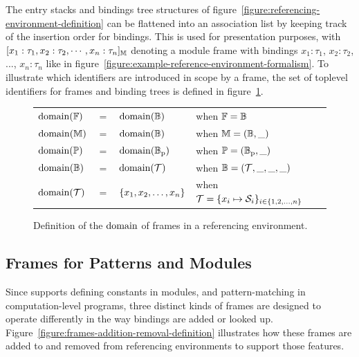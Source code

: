 The entry stacks and bindings tree structures of figure~\ref{figure:referencing-environment-definition} can be flattened into an association list by keeping track of the insertion order for bindings.
This is used for presentation purposes, with $[x_1 : \tau_1, x_2 : \tau_2, \cdots, x_n : \tau_n]_{\mathbb{M}}$ denoting a module frame with bindings $x_1 : \tau_1$, $x_2 : \tau_2$, ..., $x_n : \tau_n$ like in figure~\ref{figure:example-reference-environment-formalism}.
To illustrate which identifiers are introduced in scope by a frame, the set of toplevel identifiers for frames and binding trees is defined in figure~\ref{figure:definition-domain-frames}.

\begin{figure}[H]
\centering
{\footnotesize
\begin{tabular}{lcll}
$\operatorname{domain}(\mathbb{F})$ & $=$ & $\operatorname{domain}(\mathbb{B})$ & when $\mathbb{F} = \mathbb{B}$\\
$\operatorname{domain}(\mathbb{M})$ & $=$ & $\operatorname{domain}(\mathbb{B})$ & when $\mathbb{M} = (\mathbb{B}, \_)$\\
$\operatorname{domain}(\mathbb{P})$ & $=$ & $\operatorname{domain}(\mathbb{B}_{\text{p}})$ & when $\mathbb{P} = (\mathbb{B}_{\text{p}}, \_)$\\
$\operatorname{domain}(\mathbb{B})$ & $=$ & $\operatorname{domain}(\mathcal{T})$ & when $\mathbb{B}=(\mathcal{T}, \_, \_, \_)$\\
$\operatorname{domain}(\mathcal{T})$ & $=$ & $\{x_1, x_2, \dots, x_n\}$ & when $\mathcal{T} = \{x_i \mapsto \mathcal{S}_i\}_{i \in \{1, 2, \dots, n\}}$
\end{tabular}
}
\caption[Definition of the domain of frames]{%
Definition of the $\operatorname{domain}$ of frames in a \Beluga referencing environment.
}
\label{figure:definition-domain-frames}
\end{figure}

\subsection{Frames for Patterns and Modules}


Since \Beluga supports defining constants in modules, and pattern-matching in computation-level programs, three distinct kinds of frames are designed to operate differently in the way bindings are added or looked up.
Figure~\ref{figure:frames-addition-removal-definition} illustrates how these frames are added to and removed from referencing environments to support those features.

